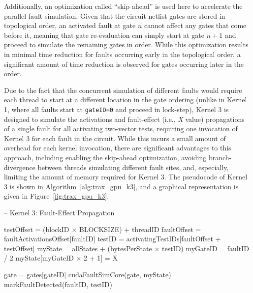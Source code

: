Additionally, an optimization called ``skip ahead'' is used here to accelerate the parallel fault simulation.
%
Given that the circuit netlist gates are stored in topological order, an activated fault at gate $n$ cannot affect any gates that come before it, meaning that gate re-evaluation can simply start at gate $n+1$ and proceed to simulate the remaining gates in order.
%
While this optimization results in minimal time reduction for faults occurring early in the topological order, a significant amount of time reduction is observed for gates occurring later in the order.

Due to the fact that the concurrent simulation of different faults would require each thread to start at a different location in the gate ordering (unlike in Kernel 1, where all faults start at \verb+gateID=0+ and proceed in lock-step), Kernel 3 is designed to simulate the activations and fault-effect (i.e., \textit{X} value) propagations of a single fault for all activating two-vector tests, requiring one invocation of Kernel 3 for each fault in the circuit.
%
While this incurs a small amount of overhead for each kernel invocation, there are significant advantages to this approach, including enabling the skip-ahead optimization, avoiding branch-divergence between threads simulating different fault sites, and, especially, limiting the amount of memory required for Kernel 3.
%
The pseudocode of Kernel 3 is shown in Algorithm~\ref{alg:trax_gpu_k3}, and a graphical representation is given in Figure~\ref{fig:trax_gpu_k3}.

\begin{algorithm}
\centering
\caption[GPU Kernel 3: Fault-Effect Propagation]{-- Kernel 3: Fault-Effect Propagation}
\label{alg:trax_gpu_k3}
\begin{algorithmic}[1]
\STATE testOffset = (blockID $\times$ BLOCKSIZE) + threadID
\STATE faultOffset = faultActivationsOffset[faultID]
  \STATE testID = activatingTestIDs[faultOffset + testOffset]
  \STATE myState = allStates + (bytesPerState $\times$ testID)
  \STATE myGateID = faultID / 2
  \STATE myState[myGateID $\times$ 2 + 1] = X

    \STATE gate = gates[gateID]
    \STATE cudaFaultSimCore(gate, myState)
      \STATE markFaultDetected(faultID, testID)
    \ENDIF
  \ENDFOR
\ENDIF
\end{algorithmic}
\end{algorithm}

